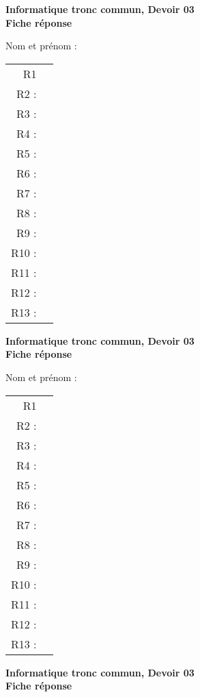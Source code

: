 \documentclass[francais,a4paper,div=19,12 pt]{scrartcl}
\begin{document}
\pagestyle{empty}
\newcommand{\rep}{\fbox{\phantom{\raisebox{0pt}[.5cm][.3cm]{}\makebox[9.5cm]{}}}}
\begin{center}
 \textbf{Informatique tronc commun, Devoir 03}\\
 \textbf{Fiche réponse}
\end{center}

\medskip{}
 Nom  et prénom : \hfill 

\bigskip{}

\centerline{}
\medskip{}
\begin{center}
\begin{tabular}{rc}
R1  & \rep \\[1 em] 
R2 : & \rep \\[1 em] 
R3 : & \rep \\[1 em] 
R4 : & \rep \\[1 em] 
R5 : & \rep \\[1 em] 
R6 : & \rep \\[1 em] 
R7 : & \rep \\[1 em] 
R8 : & \rep \\[1 em] 
R9 : & \rep \\[1 em] 
R10 : & \rep \\[1 em] 
R11 : & \rep \\[1 em] 
R12 : & \rep \\[1 em] 
R13 : & \rep \\[1 em] 
\end{tabular}
\end{center}\newpage
\begin{center}
 \textbf{Informatique tronc commun, Devoir 03}\\
 \textbf{Fiche réponse}
\end{center}

\medskip{}
 Nom  et prénom : \hfill 

\bigskip{}

\centerline{}
\medskip{}
\begin{center}
\begin{tabular}{rc}
R1  & \rep \\[1 em] 
R2 : & \rep \\[1 em] 
R3 : & \rep \\[1 em] 
R4 : & \rep \\[1 em] 
R5 : & \rep \\[1 em] 
R6 : & \rep \\[1 em] 
R7 : & \rep \\[1 em] 
R8 : & \rep \\[1 em] 
R9 : & \rep \\[1 em] 
R10 : & \rep \\[1 em] 
R11 : & \rep \\[1 em] 
R12 : & \rep \\[1 em] 
R13 : & \rep \\[1 em] 
\end{tabular}
\end{center}\newpage
\begin{center}
 \textbf{Informatique tronc commun, Devoir 03}\\
 \textbf{Fiche réponse}
\end{center}
\end{document}
